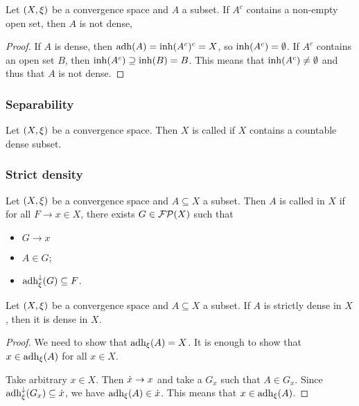 \begin{lemma} \label{openDensityLemma}
Let $\sSet{X, \xi}$ be a convergence space and $A$ a subset.
If $A^c$ contains a non-empty open set, then $A$ is not dense,
\end{lemma}
\begin{proof}
If $A$ is dense, then $\operatorname{adh}(A) = \operatorname{inh}(A^c)^c = X$, so $\operatorname{inh}(A^c) = \emptyset$. If $A^c$ contains an open set $B$, then $\operatorname{inh}(A^c) \supseteq \operatorname{inh}(B) = B$. This means that $\operatorname{inh}(A^c) \neq \emptyset$ and thus that $A$ is not dense.
\end{proof}

\subsubsection{Separability}
\begin{definition}
Let $\sSet{X, \xi}$ be a convergence space. Then $X$ is called  if $X$ contains a countable dense subset.
\end{definition}

\subsubsection{Strict density}
\begin{definition}
Let $\sSet{X,\xi}$ be a convergence space and $A\subseteq X$ a subset. Then $A$ is called  in $X$ if for all $F\to x\in X$, there exists $G\in \operatorname{\mathcal{FP}}(X)$ such that
\begin{itemize}
\item $G\to x$
\item $A\in G$;
\item $\operatorname{adh}_\xi^\downarrow(G)\subseteq F$.
\end{itemize} 
\end{definition}

\begin{lemma}
Let $\sSet{X,\xi}$ be a convergence space and $A\subseteq X$ a subset. If $A$ is strictly dense in $X$, then it is dense in $X$.
\end{lemma}
\begin{proof}
We need to show that $\operatorname{adh}_\xi(A) = X$. It is enough to show that $x\in \operatorname{adh}_\xi(A)$ for all $x\in X$.

Take arbitrary $x\in X$. Then $\dot{x}\to x$ and take a $G_x$ such that $A\in G_x$. Since $\operatorname{adh}_\xi^\downarrow(G_x)\subseteq \dot{x}$, we have $\operatorname{adh}_\xi(A) \in \dot{x}$. This means that $x\in \operatorname{adh}_\xi(A)$. 
\end{proof}


